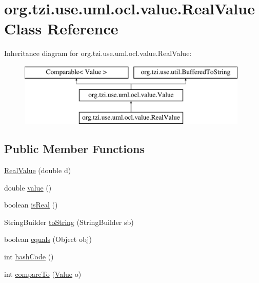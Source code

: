 \hypertarget{classorg_1_1tzi_1_1use_1_1uml_1_1ocl_1_1value_1_1_real_value}{\section{org.\-tzi.\-use.\-uml.\-ocl.\-value.\-Real\-Value Class Reference}
\label{classorg_1_1tzi_1_1use_1_1uml_1_1ocl_1_1value_1_1_real_value}
}
Inheritance diagram for org.\-tzi.\-use.\-uml.\-ocl.\-value.\-Real\-Value\-:\begin{figure}[H]
\begin{center}
\leavevmode
\includegraphics[height=3.000000cm]{classorg_1_1tzi_1_1use_1_1uml_1_1ocl_1_1value_1_1_real_value}
\end{center}
\end{figure}
\subsection*{Public Member Functions}
\begin{DoxyCompactItemize}
\item 
\hyperlink{classorg_1_1tzi_1_1use_1_1uml_1_1ocl_1_1value_1_1_real_value_a9e309e839e3389d51d28e7d2da43bed0}{Real\-Value} (double d)
\item 
double \hyperlink{classorg_1_1tzi_1_1use_1_1uml_1_1ocl_1_1value_1_1_real_value_a9156a21e9116b5e4041bf4cb4e4c6223}{value} ()
\item 
boolean \hyperlink{classorg_1_1tzi_1_1use_1_1uml_1_1ocl_1_1value_1_1_real_value_a88529e2e57e330b09b15fd92701a9361}{is\-Real} ()
\item 
String\-Builder \hyperlink{classorg_1_1tzi_1_1use_1_1uml_1_1ocl_1_1value_1_1_real_value_a5b1f2059ae1ae44b857dd61f7bb1d00e}{to\-String} (String\-Builder sb)
\item 
boolean \hyperlink{classorg_1_1tzi_1_1use_1_1uml_1_1ocl_1_1value_1_1_real_value_a20af66995446fabc723d588e1f91faf3}{equals} (Object obj)
\item 
int \hyperlink{classorg_1_1tzi_1_1use_1_1uml_1_1ocl_1_1value_1_1_real_value_a01529a18376fcb577fe0cdd1b508eb21}{hash\-Code} ()
\item 
int \hyperlink{classorg_1_1tzi_1_1use_1_1uml_1_1ocl_1_1value_1_1_real_value_a8ee004b5f1bb01d3deea288ca998b797}{compare\-To} (\hyperlink{classorg_1_1tzi_1_1use_1_1uml_1_1ocl_1_1value_1_1_value}{Value} o)
\end{DoxyCompactItemize}
